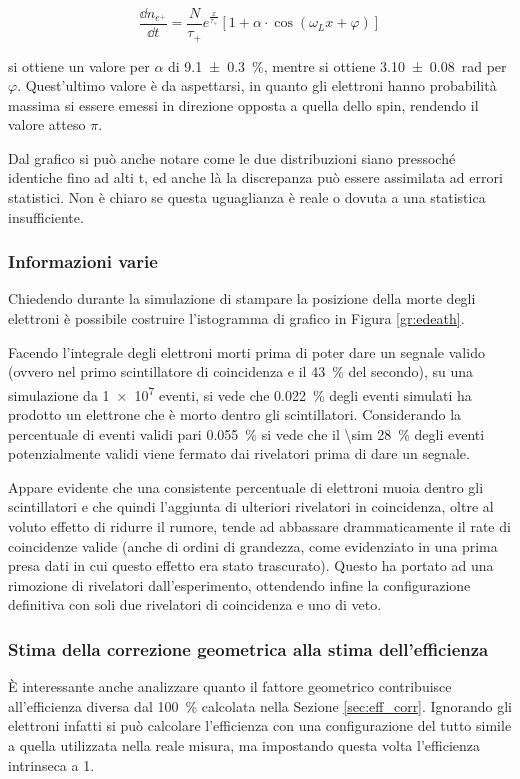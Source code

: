 \begin{equation}
	\frac{\dd n_{e^+}}{\dd t} = \frac{N}{\tau_+}e^{\frac{x}{\tau_+}}\left[1 + \alpha\cdot\cos(\omega_L x + \varphi)\right]
	\label{eq:sim_fit}
\end{equation}

si ottiene un valore per $\alpha$ di \SI{9.1 \pm 0.3}{\percent}, mentre si ottiene \SI{3.10 \pm 0.08}{\radian} per $\varphi$. Quest'ultimo valore \`e da aspettarsi, in quanto gli elettroni hanno probabilit\`a massima si essere emessi in direzione opposta a quella dello spin, rendendo il valore atteso $\pi$.

Dal grafico si pu\`o anche notare come le due distribuzioni siano pressoch\'e identiche fino ad alti t, ed anche l\`a la discrepanza pu\`o essere assimilata ad errori statistici. Non \`e chiaro se questa uguaglianza \`e reale o dovuta a una statistica insufficiente.

\subsubsection{Informazioni varie}
Chiedendo durante la simulazione di stampare la posizione della morte degli elettroni \`e possibile costruire l'istogramma di grafico in Figura \ref{gr:edeath}.

Facendo l'integrale degli elettroni morti prima di poter dare un segnale valido (ovvero nel primo scintillatore di coincidenza e il \SI{43}{\percent} del secondo), su una simulazione da \num{1e7} eventi, si vede che \SI{0.022}{\percent} degli eventi simulati ha prodotto un elettrone che \`e morto dentro gli scintillatori.
Considerando la percentuale di eventi validi pari \SI{0.055}{\percent} si vede che il \SI{\sim 28}{\percent} degli eventi potenzialmente validi viene fermato dai rivelatori prima di dare un segnale.

Appare evidente che una consistente percentuale di elettroni muoia dentro gli scintillatori e che quindi l'aggiunta di ulteriori rivelatori in coincidenza, oltre al voluto effetto di ridurre il rumore, tende ad abbassare drammaticamente il rate di coincidenze valide (anche di ordini di grandezza, come evidenziato in una prima presa dati in cui questo effetto era stato trascurato). Questo ha portato ad una rimozione di rivelatori dall'esperimento, ottendendo infine la configurazione definitiva con soli due rivelatori di coincidenza e uno di veto.


\subsubsection{Stima della correzione geometrica alla stima dell'efficienza}
\`E interessante anche analizzare quanto il fattore geometrico contribuisce all'efficienza diversa dal \SI{100}{\percent} calcolata nella Sezione \ref{sec:eff_corr}. Ignorando gli elettroni infatti si pu\`o calcolare l'efficienza con una configurazione del tutto simile a quella utilizzata nella reale misura, ma impostando questa volta l'efficienza intrinseca a 1.


